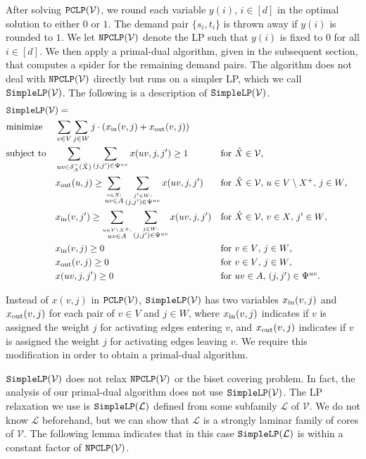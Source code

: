 \documentclass[11pt]{article}
\newcommand{\Vfam}{\mathcal{V}}
\newcommand{\Lfam}{\mathcal{L}}
\newcommand{\LP}{{\tt PCLP}}
\newcommand{\NPCLP}{{\tt NPCLP}}
\newcommand{\CoreLP}{{\tt SimpleLP}}
\begin{document}
After solving $\LP(\Vfam)$, we round
each variable $y(i)$, $i \in [d]$ 
in the optimal solution
to either $0$ or $1$.
The demand pair $\{s_i,t_i\}$ is thrown away if $y(i)$ is rounded to
$1$.
We let $\NPCLP(\Vfam)$ denote the LP such that 
$y(i)$ is fixed to $0$ for all $i \in [d]$.
We then apply a primal-dual algorithm, given in the subsequent section, that
computes a spider for the remaining demand pairs.
The algorithm does not deal with $\NPCLP(\Vfam)$ directly but
runs on a simpler LP, which we call $\CoreLP(\Vfam)$.
The following is a description of $\CoreLP(\Vfam)$.
\begin{align}
&\CoreLP(\Vfam)= \hspace*{-4em} \notag\\
 &\mbox{minimize} && \sum_{v \in V}\sum_{j \in W}j \cdot (x_{\rm in}(v,j)+x_{\rm out}(v,j))\notag\\
&\mbox{subject to} &&
\sum_{uv \in \delta^-_{A}(\hat{X})} \sum_{(j,j')\in\Psi^{uv}}x(uv,j,j') \geq 1
&&\mbox{for $\hat{X} \in \Vfam$,}\label{label.primal-c1}\\
&&&
x_{\rm out}(u,j) \geq \sum_{\stackrel{v \in X:}{uv\in A}}\sum_{\stackrel{j' \in W:}{(j,j')\in\Psi^{uv}}}x(uv,j,j') &&
\mbox{for $\hat{X}\in \Vfam$, $u \in V\setminus X^+$, $j \in W$,
 }\label{primal-c2}\\
&&&
x_{\rm in}(v,j') \geq 
 \sum_{\stackrel{u \in V\setminus X^+:}{uv\in A}} \sum_{\stackrel{j \in W:}{(j,j')\in \Psi^{uv}}}x(uv,j,j') &&
\mbox{for $\hat{X}\in \Vfam$, $v \in X$, $j' \in W$, }\label{primal-c3}\\
&&& x_{\rm in}(v,j) \geq 0 &&\mbox{for $v \in V$, $j \in W$,}\notag \\
&&& x_{\rm out}(v,j) \geq 0 &&\mbox{for $v \in V$, $j \in W$,}\notag \\
&&& x(uv,j,j') \geq 0 &&\mbox{for $uv \in A$, $(j,j') \in \Psi^{uv}$.}\notag
\end{align}

Instead of $x(v,j)$ in $\LP(\Vfam)$, $\CoreLP(\Vfam)$ has two variables $x_{\rm in}(v,j)$ and
$x_{\rm out}(v,j)$ for each pair of $v \in V$ and $j \in W$, where
$x_{\rm in}(v,j)$ indicates if $v$ is assigned the weight $j$ for
activating edges entering $v$, and 
$x_{\rm out}(v,j)$ indicates if $v$ is assigned the weight $j$ for
activating edges leaving $v$.
We require this modification in order to obtain a primal-dual algorithm.


$\CoreLP(\Vfam)$ does not relax $\NPCLP(\Vfam)$
or the biset covering problem.
In fact, the analysis of our primal-dual algorithm does not use $\CoreLP(\Vfam)$.
The LP relaxation we use is $\CoreLP(\Lfam)$ defined from some
subfamily $\Lfam$ of $\Vfam$.
We do not know $\Lfam$ beforehand, but we can show that
$\Lfam$ is a strongly laminar family of cores of $\Vfam$.
The following lemma indicates that in this case
$\CoreLP(\Lfam)$ is within a constant factor of $\NPCLP(\Vfam)$.
\end{document}
